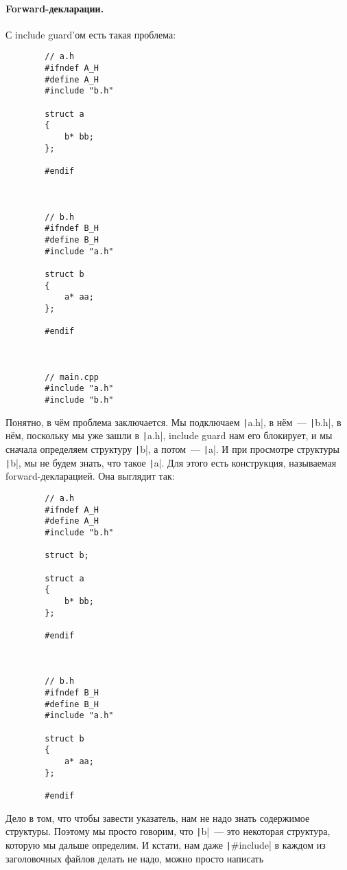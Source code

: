 \documentclass{article}
\begin{document}
    \paragraph{Forward-декларации.}
    С include guard'ом есть такая проблема:
    \begin{verbatim}
        // a.h
        #ifndef A_H
        #define A_H
        #include "b.h"
        
        struct a
        {
            b* bb;
        };
        
        #endif



        // b.h
        #ifndef B_H
        #define B_H
        #include "a.h"
        
        struct b
        {
            a* aa;
        };
        
        #endif



        // main.cpp
        #include "a.h"
        #include "b.h"
    \end{verbatim}
    Понятно, в чём проблема заключается. Мы подключаем \texttt|a.h|, в нём~--- \texttt|b.h|, в нём, поскольку мы уже зашли в \texttt|a.h|, include guard нам его блокирует, и мы сначала определяем структуру \texttt|b|, а потом~--- \texttt|a|. И при просмотре структуры \texttt|b|, мы не будем знать, что такое \texttt|a|. Для этого есть конструкция, называемая forward-декларацией. Она выглядит так:
    \begin{verbatim}
        // a.h
        #ifndef A_H
        #define A_H
        #include "b.h"

        struct b;

        struct a
        {
            b* bb;
        };

        #endif



        // b.h
        #ifndef B_H
        #define B_H
        #include "a.h"

        struct b
        {
            a* aa;
        };

        #endif
    \end{verbatim}
    Дело в том, что чтобы завести указатель, нам не надо знать содержимое структуры. Поэтому мы просто говорим, что \texttt|b|~--- это некоторая структура, которую мы дальше определим. И кстати, нам даже \texttt|#include| в каждом из заголовочных файлов делать не надо, можно просто написать
\end{document}
